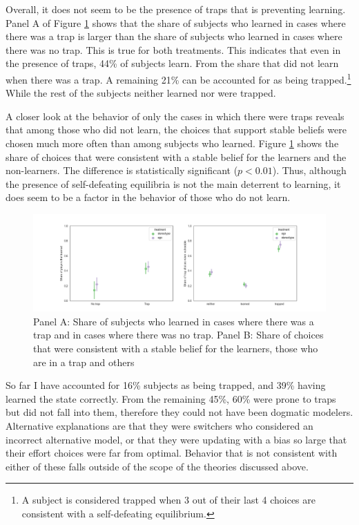 \documentclass[
  12pt,
]{article}
\begin{document}
Overall, it does not seem to be the presence of traps that is preventing
learning. Panel A of Figure \ref{fig:traps-choice} shows that the share
of subjects who learned in cases where there was a trap is larger than
the share of subjects who learned in cases where there was no trap. This
is true for both treatments. This indicates that even in the presence of
traps, 44\% of subjects learn. From the share that did not learn when
there was a trap. A remaining 21\% can be accounted for as being
trapped.\footnote{A subject is considered trapped when 3 out of their last 4 choices are consistent with 
a self-defeating equilibrium.} While the rest of the subjects neither
learned nor were trapped.

A closer look at the behavior of only the cases in which there were
traps reveals that among those who did not learn, the choices that
support stable beliefs were chosen much more often than among subjects
who learned. Figure \ref{fig:traps-choice} shows the share of choices
that were consistent with a stable belief for the learners and the
non-learners. The difference is statistically significant (\(p<0.01\)).
Thus, although the presence of self-defeating equilibria is not the main
deterrent to learning, it does seem to be a factor in the behavior of
those who do not learn.

\begin{figure}
\hypertarget{fig:traps-choice}{%
\centering
\includegraphics{../figures/trap_choice.png}
\caption{Panel A: Share of subjects who learned in cases where there was
a trap and in cases where there was no trap. Panel B: Share of choices
that were consistent with a stable belief for the learners, those who
are in a trap and others}\label{fig:traps-choice}
}
\end{figure}

So far I have accounted for 16\% subjects as being trapped, and 39\%
having learned the state correctly. From the remaining 45\%, 60\% were
prone to traps but did not fall into them, therefore they could not have
been dogmatic modelers. Alternative explanations are that they were
switchers who considered an incorrect alternative model, or that they
were updating with a bias so large that their effort choices were far
from optimal. Behavior that is not consistent with either of these falls
outside of the scope of the theories discussed above.
\end{document}
